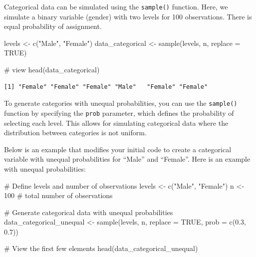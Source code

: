 \documentclass[
  singlecolumn]{article}
\newenvironment{Shaded}{}{}
\newcommand{\AttributeTok}[1]{\textcolor[rgb]{0.84,0.23,0.29}{#1}}
\newcommand{\CommentTok}[1]{\textcolor[rgb]{0.42,0.45,0.49}{#1}}
\newcommand{\ConstantTok}[1]{\textcolor[rgb]{0.00,0.36,0.77}{#1}}
\newcommand{\DecValTok}[1]{\textcolor[rgb]{0.00,0.36,0.77}{#1}}
\newcommand{\FloatTok}[1]{\textcolor[rgb]{0.00,0.36,0.77}{#1}}
\newcommand{\FunctionTok}[1]{\textcolor[rgb]{0.44,0.26,0.76}{#1}}
\newcommand{\NormalTok}[1]{\textcolor[rgb]{0.14,0.16,0.18}{#1}}
\newcommand{\OtherTok}[1]{\textcolor[rgb]{0.44,0.26,0.76}{#1}}
\newcommand{\StringTok}[1]{\textcolor[rgb]{0.01,0.18,0.38}{#1}}
\theoremstyle{definition}
\theoremstyle{remark}
\begin{document}
Categorical data can be simulated using the \texttt{sample()} function.
Here, we simulate a binary variable (gender) with two levels for 100
observations. There is equal probability of assignment.

\begin{Shaded}
\begin{Highlighting}[]
\NormalTok{levels }\OtherTok{\textless{}{-}} \FunctionTok{c}\NormalTok{(}\StringTok{"Male"}\NormalTok{, }\StringTok{"Female"}\NormalTok{)}
\NormalTok{data\_categorical }\OtherTok{\textless{}{-}} \FunctionTok{sample}\NormalTok{(levels, n, }\AttributeTok{replace =} \ConstantTok{TRUE}\NormalTok{)}

\CommentTok{\# view}
\FunctionTok{head}\NormalTok{(data\_categorical)}
\end{Highlighting}
\end{Shaded}

\begin{verbatim}
[1] "Female" "Female" "Female" "Male"   "Female" "Female"
\end{verbatim}

To generate categories with unequal probabilities, you can use the
\texttt{sample()} function by specifying the \texttt{prob} parameter,
which defines the probability of selecting each level. This allows for
simulating categorical data where the distribution between categories is
not uniform.

Below is an example that modifies your initial code to create a
categorical variable with unequal probabilities for ``Male'' and
``Female''. Here is an example with unequal probabilities:

\begin{Shaded}
\begin{Highlighting}[]
\CommentTok{\# Define levels and number of observations}
\NormalTok{levels }\OtherTok{\textless{}{-}} \FunctionTok{c}\NormalTok{(}\StringTok{"Male"}\NormalTok{, }\StringTok{"Female"}\NormalTok{)}
\NormalTok{n }\OtherTok{\textless{}{-}} \DecValTok{100} \CommentTok{\# total number of observations}

\CommentTok{\# Generate categorical data with unequal probabilities}
\NormalTok{data\_categorical\_unequal }\OtherTok{\textless{}{-}} \FunctionTok{sample}\NormalTok{(levels, n, }\AttributeTok{replace =} \ConstantTok{TRUE}\NormalTok{, }\AttributeTok{prob =} \FunctionTok{c}\NormalTok{(}\FloatTok{0.3}\NormalTok{, }\FloatTok{0.7}\NormalTok{))}

\CommentTok{\# View the first few elements}
\FunctionTok{head}\NormalTok{(data\_categorical\_unequal)}
\end{Highlighting}
\end{Shaded}
\end{document}
